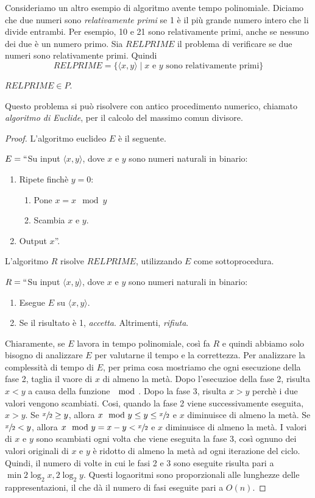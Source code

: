 \documentclass[12pt]{report}
\newcounter{theorem}
\begin{document}
Consideriamo un altro esempio di algoritmo avente tempo polinomiale. Diciamo che due numeri sono \textit{relativamente primi} se 1 è il più grande numero intero che li divide entrambi. Per esempio, 10 e 21 sono relativamente primi, anche se nessuno dei due è un numero primo. Sia $RELPRIME$ il problema di verificare se due numeri sono relativamente primi. Quindi
\[
RELPRIME = \{\langle x, y \rangle \mid x \text{ e } y \text{ sono relativamente primi}\}
\]
\begin{theorem}{}{}
	$RELPRIME \in P$.
\end{theorem}
Questo problema si può risolvere con antico procedimento numerico, chiamato \textit{algoritmo di Euclide}, per il calcolo del massimo comun divisore.
\begin{proof}
	L'algoritmo euclideo $E$ è il seguente.

	$E = ``$Su input $\langle x, y \rangle$, dove $x$ e $y$ sono numeri naturali in binario:
	\begin{enumerate}
		\item Ripete finchè $y = 0$:
		\begin{enumerate}
			\item Pone $x = x\mod y$
			\item Scambia $x$ e $y$.
		\end{enumerate}
		\item Output $x$''.
	\end{enumerate}
L'algoritmo $R$ risolve $RELPRIME$, utilizzando $E$ come sottoprocedura.

$R = ``$Su input $\langle x, y \rangle$, dove $x$ e $y$ sono numeri naturali in binario:
\begin{enumerate}
	\item Esegue $E$ su $\langle x, y \rangle$.
	\item Se il risultato è 1, \textit{accetta}. Altrimenti, \textit{rifiuta}.
\end{enumerate}
Chiaramente, se $E$ lavora in tempo polinomiale, così fa $R$ e quindi abbiamo solo bisogno di analizzare $E$ per valutarne il tempo e la correttezza. Per analizzare la complessità di tempo di $E$, per prima cosa mostriamo che ogni esecuzione della fase 2, taglia il vaore di $x$ di almeno la metà. Dopo l'esecuzioe della fase 2, risulta $x < y$ a causa della funzione $\mod$. Dopo la fase 3, risulta $x > y$ perchè i due valori vengono scambiati. Cosi, quando la fase 2 viene successivamente eseguita, $x > y$. Se $\sfrac{x}{2} \geq y$, allora $x \mod y \leq y \leq \sfrac{x}{2}$ e $x$ diminuisce di almeno la metà. Se $\sfrac{x}{2} <  y$, allora $x \mod y = x - y <\sfrac{x}{2}$ e $x$ diminuisce di almeno la metà. I valori di $x$ e $y$ sono scambiati ogni volta che viene eseguita la fase 3, così ognuno dei valori originali di $x$ e $y$ è ridotto di almeno la metà ad ogni iterazione del ciclo. Quindi, il numero di volte in cui le fasi 2 e 3 sono eseguite risulta pari a $\min{2\log_2{x}, 2\log_2{y}}$. Questi logaoritmi sono proporzionali alle lunghezze delle rappresentazioni, il che dà il numero di fasi eseguite pari a $O(n)$.
\end{proof}
\end{document}
